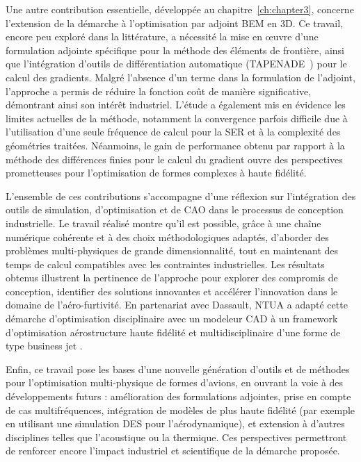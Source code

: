 Une autre contribution essentielle, développée au chapitre~\ref{ch:chapter3}, concerne l'extension de la démarche à l'optimisation par adjoint BEM en 3D. Ce travail, encore peu exploré dans la littérature, a nécessité la mise en œuvre d'une formulation adjointe spécifique pour la méthode des éléments de frontière, ainsi que l'intégration d'outils de différentiation automatique (TAPENADE~\citep{Hascoet2013}) pour le calcul des gradients. Malgré l'absence d'un terme dans la formulation de l'adjoint, l'approche a permis de réduire la fonction coût de manière significative, démontrant ainsi son intérêt industriel. L'étude a également mis en évidence les limites actuelles de la méthode, notamment la convergence parfois difficile due à l'utilisation d'une seule fréquence de calcul pour la SER et à la complexité des géométries traitées. Néanmoins, le gain de performance obtenu par rapport à la méthode des différences finies pour le calcul du gradient ouvre des perspectives prometteuses pour l'optimisation de formes complexes à haute fidélité.

L'ensemble de ces contributions s'accompagne d'une réflexion sur l'intégration des outils de simulation, d'optimisation et de CAO dans le processus de conception industrielle. Le travail réalisé montre qu'il est possible, grâce à une chaîne numérique cohérente et à des choix méthodologiques adaptés, d'aborder des problèmes multi-physiques de grande dimensionnalité, tout en maintenant des temps de calcul compatibles avec les contraintes industrielles. Les résultats obtenus illustrent la pertinence de l'approche pour explorer des compromis de conception, identifier des solutions innovantes et accélérer l'innovation dans le domaine de l'aéro-furtivité. En partenariat avec Dassault, NTUA a adapté cette démarche d'optimisation disciplinaire avec un modeleur CAD à un framework d'optimisation aérostructure haute fidélité et multidisciplinaire d'une forme de type business jet \citep{Tsiakas2024}.

Enfin, ce travail pose les bases d'une nouvelle génération d'outils et de méthodes pour l'optimisation multi-physique de formes d'avions, en ouvrant la voie à des développements futurs : amélioration des formulations adjointes, prise en compte de cas multifréquences, intégration de modèles de plus haute fidélité (par exemple en utilisant une simulation DES pour l'aérodynamique), et extension à d'autres disciplines telles que l'acoustique ou la thermique. Ces perspectives permettront de renforcer encore l'impact industriel et scientifique de la démarche proposée.

\printbibliography[heading=subbibintoc]
